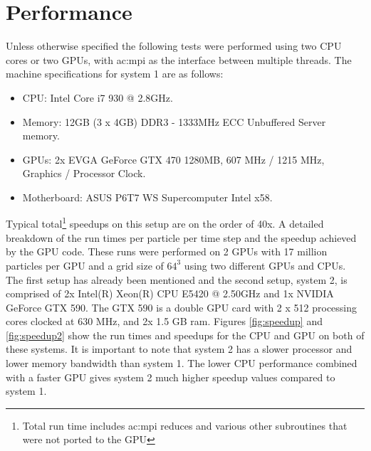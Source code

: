 \chapter{Performance}
\label{ch:performance} 
	Unless otherwise specified the following tests were performed using two CPU cores or two GPUs, with \gls{ac:mpi} as the interface between multiple threads. The machine specifications for system 1 are as follows:
\begin{itemize}
	\item CPU: Intel Core i7 930 @ 2.8GHz.
	\item Memory: 12GB (3 x 4GB) DDR3 - 1333MHz ECC Unbuffered Server memory. 
	\item GPUs: 2x EVGA GeForce GTX 470 1280MB, 607 MHz / 1215 MHz, Graphics / Processor Clock. 
	\item Motherboard: ASUS P6T7 WS Supercomputer Intel x58.
\end{itemize}

Typical total\footnote[1]{Total run time includes \gls{ac:mpi} reduces and various other subroutines that were not ported to the GPU} speedups on this setup are on the order of 40x. A detailed breakdown of the run times per particle per time step and the speedup achieved by the GPU code. These runs were performed on 2 GPUs with 17 million particles per GPU and a grid size of $64^3$ using two different GPUs and CPUs. The first setup has already been mentioned and the second setup, system 2, is comprised of 2x  Intel(R) Xeon(R) CPU E5420 @ 2.50GHz and 1x NVIDIA GeForce GTX 590. The GTX 590 is a double GPU card with 2 x 512 processing cores clocked at 630 MHz, and 2x 1.5 GB ram. Figures \ref{fig:speedup} and \ref{fig:speedup2} show the run times and speedups for the CPU and GPU on both of these systems. It is important to note that system 2 has a slower processor and lower memory bandwidth than system 1. The lower CPU performance combined with a faster GPU gives system 2 much higher speedup values compared to system 1.

